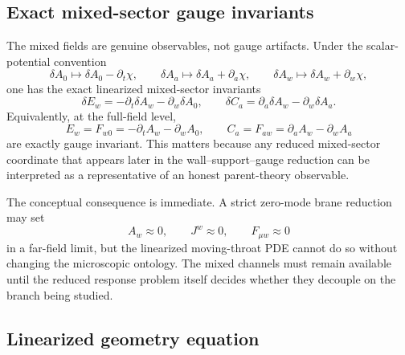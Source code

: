 \documentclass[11pt]{article}
\theoremstyle{definition}
\begin{document}
\subsection{Exact mixed-sector gauge invariants}

The mixed fields are genuine observables, not gauge artifacts. Under the scalar-potential convention
\begin{equation}
\delta A_0\mapsto \delta A_0-\partial_t\chi,
\qquad
\delta A_a\mapsto \delta A_a+\partial_a\chi,
\qquad
\delta A_w\mapsto \delta A_w+\partial_w\chi,
\label{eq:linpde-gauge-transform}
\end{equation}
one has the exact linearized mixed-sector invariants
\begin{equation}
\delta E_w=-\partial_t\delta A_w-\partial_w\delta A_0,
\qquad
\delta C_a=\partial_a\delta A_w-\partial_w\delta A_a.
\label{eq:linpde-mixed-invariants}
\end{equation}
Equivalently, at the full-field level,
\[
E_w=F_{w0}=-\partial_t A_w-\partial_w A_0,
\qquad
C_a=F_{aw}=\partial_a A_w-\partial_w A_a
\]
are exactly gauge invariant. This matters because any reduced mixed-sector coordinate that appears later in the wall--support--gauge reduction can be interpreted as a representative of an honest parent-theory observable.

The conceptual consequence is immediate. A strict zero-mode brane reduction may set
\[
A_w\approx 0,
\qquad
J^w\approx 0,
\qquad
F_{\mu w}\approx 0
\]
in a far-field limit, but the linearized moving-throat PDE cannot do so without changing the microscopic ontology. The mixed channels must remain available until the reduced response problem itself decides whether they decouple on the branch being studied.

\subsection{Linearized geometry equation}
\end{document}
